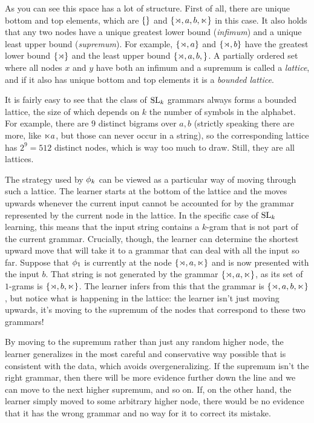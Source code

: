 As you can see this space has a lot of structure.
First of all, there are unique bottom and top elements, which are $\left \{  \right \}$ and $\left \{ \rtimes, a, b, \ltimes \right \}$ in this case.
It also holds that any two nodes have a unique greatest lower bound (\emph{infimum}) and a unique least upper bound (\emph{supremum}).
For example, $\left \{ \rtimes,a \right \}$ and $\left \{ \rtimes,b \right \}$ have the greatest lower bound $\left \{ \rtimes \right \}$ and the least upper bound $\left \{ \rtimes,a,b, \right \}$.
A partially ordered set where all nodes $x$ and $y$ have both an infimum and a supremum is called a \emph{lattice}, and if it also has unique bottom and top elements it is a \emph{bounded lattice}.

It is fairly easy to see that the class of $\mathrm{SL}_k$ grammars always forms a bounded lattice, the size of which depends on $k$ the number of symbols in the alphabet.
For example, there are $9$ distinct bigrams over $a,b$ (strictly speaking there are more, like $\ltimes a$, but those can never occur in a string), so the corresponding lattice has $2^9 = 512$ distinct nodes, which is way too much to draw.
Still, they are all lattices.

The strategy used by $\phi_k$ can be viewed as a particular way of moving through such a lattice.
The learner starts at the bottom of the lattice and the moves upwards whenever the current input cannot be accounted for by the grammar represented by the current node in the lattice.
In the specific case of $\mathrm{SL}_k$ learning, this means that the input string contains a $k$-gram that is not part of the current grammar.
Crucially, though, the learner can determine the shortest upward move that will take it to a grammar that can deal with all the input so far.
Suppose that $\phi_1$ is currently at the node $\left \{ \rtimes, a, \ltimes \right \}$ and is now presented with the input $b$.
That string is not generated by the grammar $\left \{ \rtimes, a, \ltimes \right \}$, as its set of $1$-grams is $\left \{ \rtimes, b, \ltimes \right \}$.
The learner infers from this that the grammar is $\left \{ \rtimes, a, b, \ltimes \right \}$, but notice what is happening in the lattice:
the learner isn't just moving upwards, it's moving to the supremum of the nodes that correspond to these two grammars!

By moving to the supremum rather than just any random higher node, the learner generalizes in the most careful and conservative way possible that is consistent with the data, which avoids overgeneralizing.
If the supremum isn't the right grammar, then there will be more evidence further down the line and we can move to the next higher supremum, and so on.
If, on the other hand, the learner simply moved to some arbitrary higher node, there would be no evidence that it has the wrong grammar and no way for it to correct its mistake.

